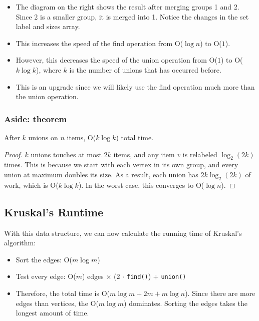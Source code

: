 \documentclass[10pt]{article}
\begin{document}
\begin{itemize}
    \item The diagram on the right shows the result after merging groups 1 and 2.  Since 2 is a smaller group, it is merged into 1.  Notice the changes in the set label and sizes array.
    \item This increases the speed of the find operation from O($\log n$) to O($1$).
    \item However, this decreases the speed of the union operation from O($1$) to O($k \log k$), where $k$ is the number of unions that has occurred before.
    \item This is an upgrade since we will likely use the find operation much more than the union operation.
\end{itemize}
\subsubsection*{Aside: theorem}
After $k$ unions on $n$ items, O($k \log k$) total time.\\
\begin{proof}
    $k$ unions touches at most $2k$ items, and any item $v$ is relabeled $\log_2(2k)$ times.  This is because we start with each vertex in its own group, and every union at maximum doubles its size.  As a result, each union has $2k \log_2(2k)$ of work, which is O($k \log k$).  In the worst case, this converges to O($\log n$).
\end{proof}
\subsection*{Kruskal's Runtime}
With this data structure, we can now calculate the running time of Kruskal's algorithm:
\begin{itemize}
    \item Sort the edges: O($m \log m$)
    \item Test every edge: O($m$) edges $\times$ (2 $\cdot$ \texttt{find()}) + \texttt{union()}
    \item Therefore, the total time is O($m \log m + 2m + m \log n$).  Since there are more edges than vertices, the O($m \log m$) dominates.  Sorting the edges takes the longest amount of time.
\end{itemize}
\end{document}
